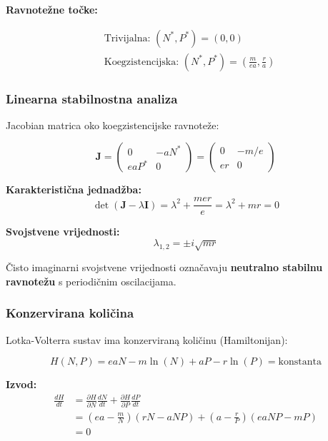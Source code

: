 \documentclass[11pt,oneside]{book}
\begin{document}
\textbf{Ravnotežne točke:}

\begin{align}
	&\text{Trivijalna: } (N^*, P^*) = (0, 0) \\
	&\text{Koegzistencijska: } (N^*, P^*) = \left(\frac{m}{ea}, \frac{r}{a}\right)
\end{align}

\subsubsection{Linearna stabilnostna analiza}

Jacobian matrica oko koegzistencijske ravnoteže:

\begin{equation}
	\mathbf{J} = \begin{pmatrix}
		0 & -aN^* \\
		eaP^* & 0
	\end{pmatrix} = \begin{pmatrix}
		0 & -m/e \\
		er & 0
	\end{pmatrix}
\end{equation}

\textbf{Karakteristična jednadžba:}
\begin{equation}
	\det(\mathbf{J} - \lambda\mathbf{I}) = \lambda^2 + \frac{mer}{e} = \lambda^2 + mr = 0
\end{equation}

\textbf{Svojstvene vrijednosti:}
\begin{equation}
	\lambda_{1,2} = \pm i\sqrt{mr}
\end{equation}

Čisto imaginarni svojstvene vrijednosti označavaju \textbf{neutralno stabilnu ravnotežu} s periodičnim oscilacijama.

\subsubsection{Konzervirana količina}

Lotka-Volterra sustav ima konzerviraną količinu (Hamiltonijan):

\begin{equation}
	H(N, P) = eaN - m\ln(N) + aP - r\ln(P) = \text{konstanta}
\end{equation}

\textbf{Izvod:}
\begin{align}
	\frac{dH}{dt} &= \frac{\partial H}{\partial N}\frac{dN}{dt} + \frac{\partial H}{\partial P}\frac{dP}{dt} \\
	&= \left(ea - \frac{m}{N}\right)(rN - aNP) + \left(a - \frac{r}{P}\right)(eaNP - mP) \\
	&= 0
\end{align}
\end{document}
